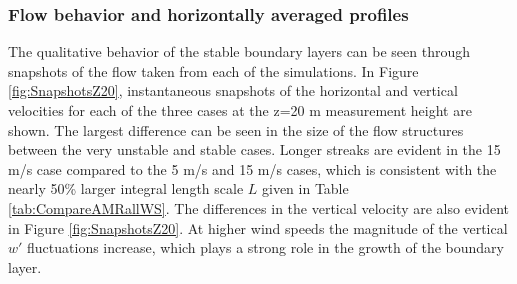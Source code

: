 \subsubsection{Flow behavior and horizontally averaged profiles}

The qualitative behavior of the stable boundary layers can be seen
through snapshots of the flow taken from each of the simulations.  In
Figure \ref{fig:SnapshotsZ20}, instantaneous snapshots of the
horizontal and vertical velocities for each of the three cases at the
z=20 m measurement height are shown.  The largest difference can be
seen in the size of the flow structures between the very unstable and
stable cases.  Longer streaks are evident in the 15 m/s case compared
to the 5 m/s and 15 m/s cases, which is consistent with the nearly
50\% larger integral length scale $L$ given in Table
\ref{tab:CompareAMRallWS}.  The differences in the vertical velocity
are also evident in Figure  \ref{fig:SnapshotsZ20}.  At higher wind speeds the
magnitude of the vertical $w'$ fluctuations increase, which plays a
strong role in the growth of the boundary layer.

